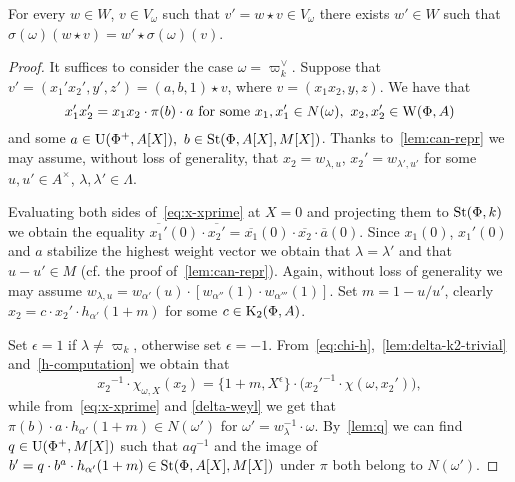 \begin{lemma}
 For every $w \in W$, $v \in V_\omega$ such that $v' = w \star v \in V_\omega$ there exists $w' \in W$ such that $\sigma(\omega)(w \star v) = w' \star \sigma(\omega)(v)$.
\end{lemma}
\begin{proof}
 It suffices to consider the case $\omega = \varpi_k^\vee$. Suppose that $v' = (x_1' x_2', y', z') = (a, b, 1) \star v$, where $v = (x_1 x_2, y, z)$. We have that
 \begin{equation}\label{eq:x-xprime} x_1' x_2' = x_1 x_2 \cdot \pi(b) \cdot a  \text{ for some }x_1, x_1' \in N(\omega),\ x_2, x_2' \in \operatorname{W}(\Phi, A) \end{equation}
 and some $a \in \operatorname{U}(\Phi^+, A[X]),\ b \in \operatorname{St}(\Phi, A[X], M[X])$. Thanks to~\cref{lem:can-repr} we may assume, without loss of generality, that $x_2 = w_{\lambda, u}$, $x_2' = w_{\lambda', u'}$
for some $u, u' \in A^\times$, $\lambda, \lambda' \in \Lambda$.


Evaluating both sides of~\eqref{eq:x-xprime} at $X=0$ and projecting them to $\operatorname{St}(\Phi, k)$ we obtain the equality $\overline{x_1'}(0) \cdot \overline{x_2'} = \overline{x_1}(0) \cdot \overline{x_2}\cdot \overline{a}(0).$
Since $x_1(0)$, $x_1'(0)$ and $a$ stabilize the highest weight vector we obtain that $\lambda = \lambda'$ and that $u - u' \in M$ (cf. the proof of~\cref{lem:can-repr}).
Again, without loss of generality we may assume $w_{\lambda, u} = w_{\alpha'}(u) \cdot [ w_{\alpha''}(1) \cdot w_{\alpha'''}(1)]$. Set $m = 1 - u/u'$, clearly $x_2 = c \cdot x_2' \cdot h_{\alpha'}(1 + m)$ for some $c \in \operatorname{K}_2(\Phi, A)$.


Set $\epsilon = 1$ if $\lambda\neq \varpi_k$, otherwise set $\epsilon = -1$.
From~\eqref{eq:chi-h},~\cref{lem:delta-k2-trivial} and~\cref{h-computation} we obtain that
\begin{equation}\label{eq:central-term} {x_2}^{-1} \cdot \chi_{\omega, X}(x_2) = \{1+m, X^\epsilon\} \cdot \bigl({x_2'}^{-1} \cdot \chi(\omega, x_2')\bigr), \end{equation}
while from~\eqref{eq:x-xprime} and \cref{delta-weyl} we get that
$\pi(b) \cdot a \cdot h_{\alpha'}(1 + m) \in N(\omega')$ for $\omega' = w_\lambda^{-1} \cdot \omega$. By~\cref{lem:q} we can find $q \in \operatorname{U}(\Phi^+, M[X])$ such that $a q^{-1}$ and the image of $b' = q \cdot b^a \cdot h_{\alpha'}(1+m) \in \operatorname{St}(\Phi, A[X], M[X])$ under $\pi$ both belong to $N(\omega')$.



\end{proof}
